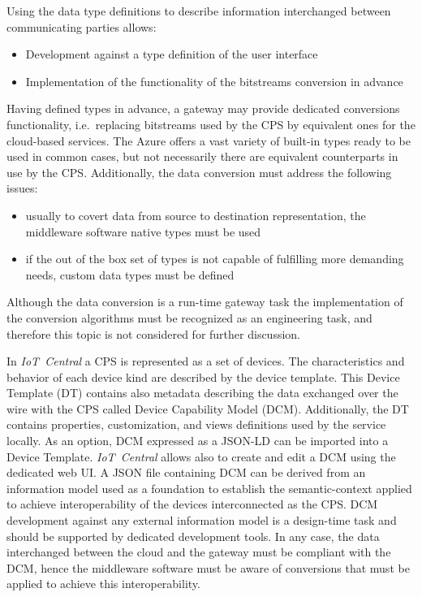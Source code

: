 \documentclass{article}
\begin{document}
Using the data type definitions to describe information interchanged
between communicating parties allows:

\begin{itemize}
      \item Development against a type definition of the user interface
      \item Implementation of the functionality of the bitstreams conversion in advance
\end{itemize}

Having defined types in advance, a gateway may provide dedicated conversions functionality, i.e.~replacing bitstreams used by the CPS by equivalent ones for the cloud-based services. The Azure offers a vast variety of built-in types ready to be used in common cases, but not necessarily there are equivalent counterparts in use by the CPS. Additionally, the data conversion must address the following issues:

\begin{itemize}
      \item usually to covert data from source to destination representation, the middleware software native types must be used
      \item if the out of the box set of types is not capable of fulfilling more demanding needs, custom data types must be defined
\end{itemize}

Although the data conversion is a run-time gateway task the
implementation of the conversion algorithms must be recognized as an
engineering task, and therefore this topic is not considered for further
discussion.

In \textit{IoT\ Central} a CPS is represented as a set
of devices. The characteristics and behavior of each device kind are
described by the device template. This Device Template (DT) contains
also metadata describing the data exchanged over the
wire with the CPS called Device Capability Model
(DCM). Additionally, the DT contains properties, customization, and
views definitions used by the service locally. As an option, DCM
expressed as a JSON-LD can be imported into a Device Template.
\textit{IoT\ Central} allows also to create and edit a DCM using the
dedicated web UI. A JSON file containing DCM can be derived from an
information model used as a foundation to establish the semantic-context
applied to achieve interoperability of the devices interconnected as the
CPS. DCM development against any external information
model is a design-time task and should be supported by dedicated
development tools. In any case, the data interchanged between the cloud
and the gateway must be compliant with the DCM, hence the middleware
software must be aware of conversions that must be applied to achieve
this interoperability.
\end{document}

